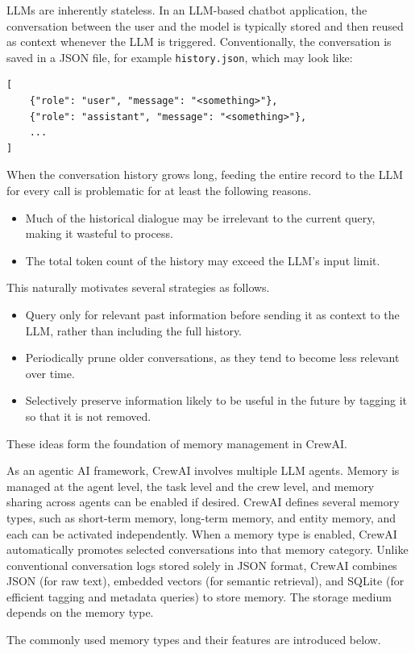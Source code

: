 LLMs are inherently stateless. In an LLM-based chatbot application, the conversation between the user and the model is typically stored and then reused as context whenever the LLM is triggered. Conventionally, the conversation is saved in a JSON file, for example \verb|history.json|, which may look like:
\begin{lstlisting}
[
	{"role": "user", "message": "<something>"},
	{"role": "assistant", "message": "<something>"},
	...
]
\end{lstlisting}

When the conversation history grows long, feeding the entire record to the LLM for every call is problematic for at least the following reasons.
\begin{itemize}
	\item Much of the historical dialogue may be irrelevant to the current query, making it wasteful to process.
	\item The total token count of the history may exceed the LLM’s input limit.
\end{itemize}
This naturally motivates several strategies as follows.
\begin{itemize}
	\item Query only for relevant past information before sending it as context to the LLM, rather than including the full history.
	\item Periodically prune older conversations, as they tend to become less relevant over time.
	\item Selectively preserve information likely to be useful in the future by tagging it so that it is not removed.
\end{itemize}
These ideas form the foundation of memory management in CrewAI.

As an agentic AI framework, CrewAI involves multiple LLM agents. Memory is managed at the agent level, the task level and the crew level, and memory sharing across agents can be enabled if desired. CrewAI defines several memory types, such as short-term memory, long-term memory, and entity memory, and each can be activated independently. When a memory type is enabled, CrewAI automatically promotes selected conversations into that memory category. Unlike conventional conversation logs stored solely in JSON format, CrewAI combines JSON (for raw text), embedded vectors (for semantic retrieval), and SQLite (for efficient tagging and metadata queries) to store memory. The storage medium depends on the memory type.

The commonly used memory types and their features are introduced below.

